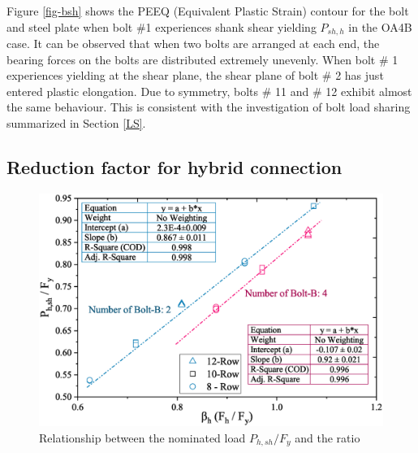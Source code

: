 Figure \ref{fig-bsh} shows the PEEQ (Equivalent Plastic Strain) contour for the bolt and steel plate when bolt \#1 experiences shank shear yielding $P_{sh,h}$ in the OA4B case. It can be observed that when two bolts are arranged at each end, the bearing forces on the bolts are distributed extremely unevenly. When bolt \# 1 experiences yielding at the shear plane, the shear plane of bolt \# 2 has just entered plastic elongation. Due to symmetry, bolts \# 11 and \# 12 exhibit almost the same behaviour. This is consistent with the investigation of bolt load sharing summarized in Section \ref{LS}.



\subsection{Reduction factor for hybrid connection}




\begin{figure}
    \centering
    \includegraphics[width=0.85\linewidth]{imgs/ch7/pser-py.eps}
    \caption{Relationship between the nominated load $P_{h,sh} / F_y$ and the ratio}
    \label{fig-pser-py}
\end{figure}


